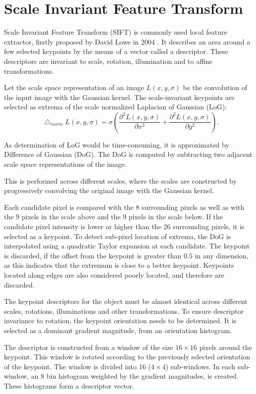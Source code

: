 \documentclass{aip-cp}
\newcommand*\Laplace{\mathop{}\!\mathbin\bigtriangleup}
\begin{document}
\section{Scale Invariant Feature Transform}
Scale Invariant Feature Transform (SIFT) is commonly used local feature extractor, firstly proposed by David Lowe in 2004 \cite{Lowe2004}. It describes an area around a few selected keypoints by the means of a vector called a descriptor. These descriptors are invariant to scale, rotation, illumination and to affine transformations.

Let the scale space representation of an image $L(x,y,\sigma)$ be the convolution of the input image with the Gaussian kernel. The scale-invariant keypoints are selected as extrema of the scale normalized Laplacian of Gaussian (LoG):
\begin{equation}
    \Laplace_{norm} L(x, y, \sigma) = \sigma \left(\frac{\partial^2 L(x,y,\sigma)}{\partial x^2} + \frac{\partial^2 L(x,y,\sigma)}{\partial y^2}\right).
\end{equation}

As determination of LoG would be time-consuming, it is approximated by Difference of Gaussian (DoG). The DoG is computed by subtracting two adjacent scale space representations of the image.

This is performed across different scales, where the scales are constructed by progressively convolving the original image with the Gaussian kernel.

Each candidate pixel is compared with the 8 surrounding pixels as well as with the 9 pixels in the scale above and the 9 pixels in the scale below. If the candidate pixel intensity is lower or higher than the 26 surrounding pixels, it is selected as a keypoint. To detect sub-pixel location of extrema, the DoG is interpolated using a quadratic Taylor expansion at each candidate. The keypoint is discarded, if the offset from the keypoint is greater than $0.5$ in any dimension, as this indicates that the extremum is close to a better keypoint. Keypoints located along edges are also considered poorly located, and therefore are discarded.

The keypoint descriptors for the object must be almost identical across different scales, rotations, illuminations and other transformations. To ensure descriptor invariance to rotation, the keypoint orientation needs to be determined. It is selected as a dominant gradient magnitude, from an orientation histogram.

The descriptor is constructed from a window of the size $16 \times 16$ pixels around the keypoint. This window is rotated according to the previously selected orientation of the keypoint. The window is divided into 16 ($4 \times 4$) sub-windows. In each sub-window, an $8$ bin histogram weighted by the gradient magnitudes, is created. These histograms form a descriptor vector.
\end{document}
